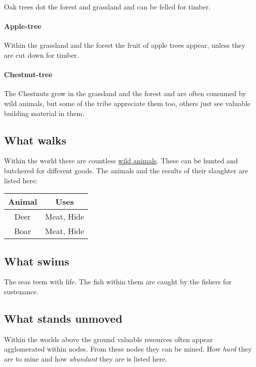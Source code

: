 Oak trees dot the forest and grassland and can be felled for timber.

\paragraph{Apple-tree}

Within the grassland and the forest the fruit of apple trees appear, unless
they are cut down for timber.

\paragraph{Chestnut-tree}

The Chestnuts grow in the grassland and the forest and are often consumed by
wild animals, but some of the tribe appreciate them too, others just see
valuable building material in them.

\subsection{What walks}\label{ch:Goods:Nature:Animals}

Within the world there are countless
\hyperref[ch:World:Inhabitants:Animals]{wild animals}. These can be hunted and
butchered for different goods. The animals and the results of their slaughter
are listed here:

\begin{longtable}{cc}
	\toprule
	Animal & Uses                   \\
	\midrule
	Deer   & \Gls{Meat}, \gls{Hide} \\
	Boar   & \Gls{Meat}, \gls{Hide} \\
	\bottomrule
\end{longtable}

\subsection{What swims}\label{ch:Goods:Nature:Sea}

The seas teem with life. The fish within them are caught by the fishers for
sustenance.

\subsection{What stands unmoved}\label{ch:Goods:Nature:Minerals}

Within the worlds above the ground valuable resources often appear agglomerated
within nodes. From these nodes they can be mined. How \emph{hard} they are to
mine and how \emph{abundant} they are is listed here.

